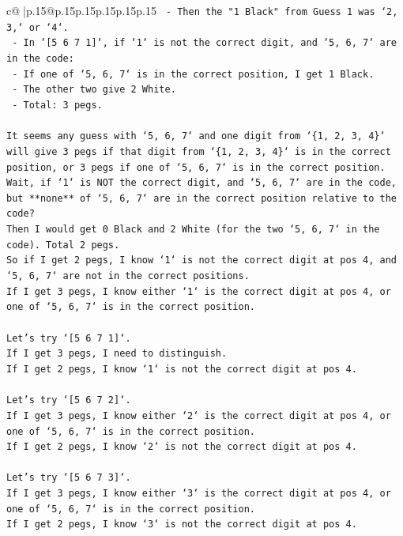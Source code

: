 \documentclass{article}
\begin{document}
{\begin{supertabular}{c@{$\;$}|p{.15\linewidth}@{}p{.15\linewidth}p{.15\linewidth}p{.15\linewidth}p{.15\linewidth}p{.15\linewidth}}
{{{\texttt{  {-} Then the "1 Black" from Guess 1 was `2, 3,` or `4`.} \\
\texttt{  {-} In `{[}5 6 7 1{]}`, if `1` is not the correct digit, and `5, 6, 7` are in the code:} \\
\texttt{    {-} If one of `5, 6, 7` is in the correct position, I get 1 Black.} \\
\texttt{    {-} The other two give 2 White.} \\
\texttt{    {-} Total: 3 pegs.} \\
\\ 
\texttt{It seems any guess with `5, 6, 7` and one digit from `\{1, 2, 3, 4\}` will give 3 pegs if that digit from `\{1, 2, 3, 4\}` is in the correct position, or 3 pegs if one of `5, 6, 7` is in the correct position.} \\
\texttt{Wait, if `1` is NOT the correct digit, and `5, 6, 7` are in the code, but **none** of `5, 6, 7` are in the correct position relative to the code?} \\
\texttt{Then I would get 0 Black and 2 White (for the two `5, 6, 7` in the code). Total 2 pegs.} \\
\texttt{So if I get 2 pegs, I know `1` is not the correct digit at pos 4, and `5, 6, 7` are not in the correct positions.} \\
\texttt{If I get 3 pegs, I know either `1` is the correct digit at pos 4, or one of `5, 6, 7` is in the correct position.} \\
\\ 
\texttt{Let's try `{[}5 6 7 1{]}`.} \\
\texttt{If I get 3 pegs, I need to distinguish.} \\
\texttt{If I get 2 pegs, I know `1` is not the correct digit at pos 4.} \\
\\ 
\texttt{Let's try `{[}5 6 7 2{]}`.} \\
\texttt{If I get 3 pegs, I know either `2` is the correct digit at pos 4, or one of `5, 6, 7` is in the correct position.} \\
\texttt{If I get 2 pegs, I know `2` is not the correct digit at pos 4.} \\
\\ 
\texttt{Let's try `{[}5 6 7 3{]}`.} \\
\texttt{If I get 3 pegs, I know either `3` is the correct digit at pos 4, or one of `5, 6, 7` is in the correct position.} \\
\texttt{If I get 2 pegs, I know `3` is not the correct digit at pos 4.} \\
}}}
\end{supertabular}}
\end{document}
